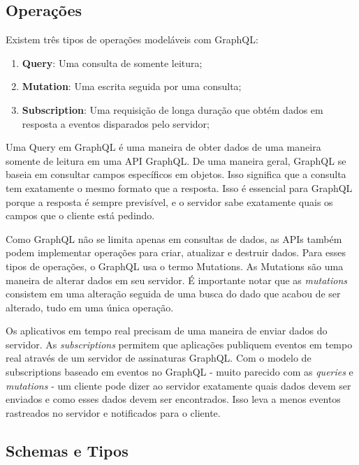 \subsection{Operações}

Existem três tipos de operações modeláveis com GraphQL:

\begin{enumerate}[label=\alph*)]
\item \textbf{Query}: Uma consulta de somente leitura;
\item \textbf{Mutation}: Uma escrita seguida por uma consulta;
\item \textbf{Subscription}: Uma requisição de longa duração que obtém dados em resposta a eventos disparados pelo servidor;
\end{enumerate}

Uma Query em GraphQL é uma maneira de obter dados de uma maneira somente de leitura em uma API GraphQL. De uma maneira geral, GraphQL se baseia em consultar campos específicos em objetos. Isso significa que a consulta tem exatamente o mesmo formato que a resposta. Isso é essencial para GraphQL porque a resposta é sempre previsível, e o servidor sabe exatamente quais os campos que o cliente está pedindo.

Como GraphQL não se limita apenas em consultas de dados, as APIs também podem implementar operações para criar, atualizar e destruir dados. Para esses tipos de operações, o GraphQL usa o termo Mutations. As Mutations são uma maneira de alterar dados em seu servidor. É importante notar que as \textit{mutations} consistem em uma alteração seguida de uma busca do dado que acabou de ser alterado, tudo em uma única operação.

Os aplicativos em tempo real precisam de uma maneira de enviar dados do servidor. As \textit{subscriptions} permitem que aplicações publiquem eventos em tempo real através de um servidor de assinaturas GraphQL. Com o modelo de subscriptions baseado em eventos no GraphQL - muito parecido com as \textit{queries} e \textit{mutations} - um cliente pode dizer ao servidor exatamente quais dados devem ser enviados e como esses dados devem ser encontrados. Isso leva a menos eventos rastreados no servidor e notificados para o cliente.

\subsection{Schemas e Tipos}


